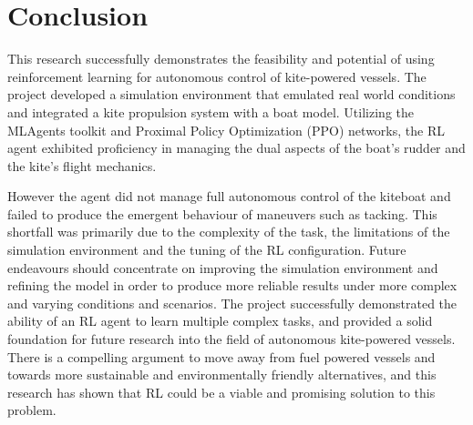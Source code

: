 \section{Conclusion}
This research successfully demonstrates the feasibility and potential of using reinforcement learning for autonomous control of kite-powered vessels. The project developed a simulation environment that emulated real world conditions and integrated a kite propulsion system with a boat model. Utilizing the MLAgents toolkit and Proximal Policy Optimization (PPO) networks, the RL agent exhibited proficiency in managing the dual aspects of the boat's rudder and the kite's flight mechanics.

However the agent did not manage full autonomous control of the kiteboat and failed to produce the emergent behaviour of maneuvers such as tacking. This shortfall was primarily due to the complexity of the task, the limitations of the simulation environment and the tuning of the RL configuration. Future endeavours should concentrate on improving the simulation environment and refining the model in order to produce more reliable results under more complex and varying conditions and scenarios. The project successfully demonstrated the ability of an RL agent to learn multiple complex tasks, and provided a solid foundation for future research into the field of autonomous kite-powered vessels. There is a compelling argument to move away from fuel powered vessels and towards more sustainable and environmentally friendly alternatives, and this research has shown that RL could be a viable and promising solution to this problem.



